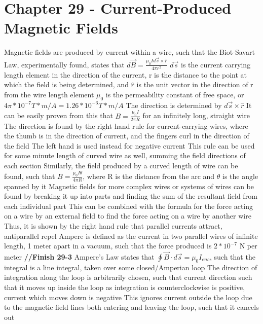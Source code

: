 \documentclass[11 pt, twoside]{article}
\newenvironment{outline*}
{
	\begin{outline}[enumerate]
	}
	{\end{outline}
}
\begin{document}
\section{Chapter 29 - Current-Produced Magnetic Fields}
\begin{outline*}
\1 Magnetic fields are produced by current within a wire, such that the Biot-Savart Law, experimentally found, states that $d\vec{B} = \frac{\mu_0 Id\vec{s} \times \hat{r}}{4\pi r^2}$
\2 $d\vec{s}$ is the current carrying length element in the direction of the current, r is the distance to the point at which the field is being determined, and $\hat{r}$ is the unit vector in the direction of r from the wire length element
\2 $\mu_0$ is the permeability constant of free space, or $4\pi * 10^{-7} T*m/A = 1.26 * 10^{-6} T*m/A$
\2 The direction is determined by $d\vec{s} \times \hat{r}$
\2 It can be easily proven from this that $B = \frac{\mu_0 I}{2\pi R}$ for an infinitely long, straight wire
\3 The direction is found by the right hand rule for current-carrying wires, where the thumb is in the direction of current, and the fingers curl in the direction of the field
\4 The left hand is used instead for negative current
\4 This rule can be used for some minute length of curved wire as well, summing the field directions of each section
\2 Similarly, the field produced by a curved length of wire can be found, such that $B = \frac{\mu_0I\theta}{4\pi R}$, where R is the distance from the arc and $\theta$ is the angle spanned by it
\2 Magnetic fields for more complex wires or systems of wires can be found by breaking it up into parts and finding the sum of the resultant field from each individual part
\2 This can be combined with the formula for the force acting on a wire by an external field to find the force acting on a wire by another wire
\3 Thus, it is shown by the right hand rule that parallel currents attract, antiparallel repel
 Ampere is defined as the current in two parallel wires of infinite length, 1 meter apart in a vacuum, such that the force produced is $2*10^{-7}$ N per meter
\3 \textbf{//Finish 29-3} 
\1 Ampere's Law states that $\oint \vec{B} \cdot d\vec{s} = \mu_0 I_{enc}$, such that the integral is a line integral, taken over some closed/Amperian loop
\2 The direction of integration along the loop is arbitrarily chosen, such that current direction such that it moves up inside the loop as integration is counterclockwise is positive, current which moves down is negative
\2 This ignores current outside the loop due to the magnetic field lines both entering and leaving the loop, such that it cancels out

\end{outline*}
\end{document}
